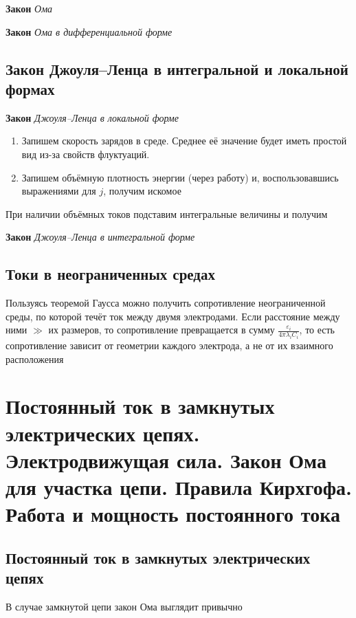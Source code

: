 \documentclass[a4paper, 14pt]{article}
\begin{document}
    \textbf{Закон} \textit{Ома}
    
    \textbf{Закон} \textit{Ома в дифференциальной форме}
    
    \subsection{Закон Джоуля–Ленца в интегральной и локальной формах}
    
    \textbf{Закон} \textit{Джоуля–Ленца в локальной форме}
    
    \begin{enumerate}
        \item Запишем скорость зарядов в среде.
        Среднее её значение будет иметь простой вид из-за свойств флуктуаций.
        \item Запишем объёмную плотность энергии (через работу) и, воспользовавшись выражениями для $j$, получим искомое
    \end{enumerate}
    
    При наличии объёмных токов подставим интегральные величины и получим
    
    \textbf{Закон} \textit{Джоуля–Ленца в интегральной форме}
    
    \subsection{Токи в неограниченных средах}
    
    Пользуясь теоремой Гаусса можно получить сопротивление неограниченной среды, по которой течёт ток между двумя
    электродами.
    Если расстояние между ними $\gg$ их размеров, то сопротивление превращается в сумму $\frac{\varepsilon_i}{4
    \pi \lambda_i C_i}$, то есть сопротивление зависит от геометрии каждого электрода, а не от их взаимного расположения
    
    \section{Постоянный ток в замкнутых электрических цепях.
    Электродвижущая сила.
    Закон Ома для участка цепи.
    Правила Кирхгофа.
    Работа и мощность постоянного тока}
    
    \subsection{Постоянный ток в замкнутых электрических цепях}
    
    В случае замкнутой цепи закон Ома выглядит привычно
    
\end{document}
